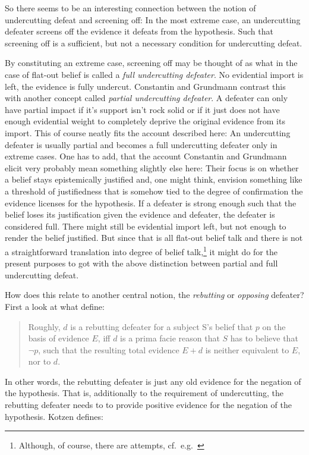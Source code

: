 \documentclass[11pt, a4paper]{scrartcl}
\renewcommand{\i}[1]{\emph{#1}}
\begin{document}
So there seems to be an interesting connection between the notion of undercutting defeat and screening off: In the most extreme case, an undercutting defeater screens off the evidence it defeats from the hypothesis. Such that screening off is a sufficient, but not a necessary condition for undercutting defeat.

By constituting an extreme case, screening off may be thought of as what in the case of flat-out belief is called a \i{full undercutting defeater}. No evidential import is left, the evidence is fully undercut. Constantin and Grundmann contrast this with another concept called \i{partial undercutting defeater}. A defeater can only have partial impact if it's support isn't rock solid or if it just does not have enough evidential weight to completely deprive the original evidence from its import. This of course neatly fits the account described here: An undercutting defeater is usually partial and becomes a full undercutting defeater only in extreme cases. One has to add, that the account Constantin and Grundmann elicit very probably mean something slightly else here: Their focus is on whether a belief stays epistemically justified and, one might think, envision something like a threshold of justifiedness that is somehow tied to the degree of confirmation the evidence licenses for the hypothesis. If a defeater is strong enough such that the belief loses its justification given the evidence and defeater, the defeater is considered full. There might still be evidential import left, but not enough to render the belief justified. But since that is all flat-out belief talk and there is not a straightforward translation into degree of belief talk,\footnote{Although, of course, there are attempts, cf.\ e.g.\ \textcite{Pettigrew2017}} it might do for the present purposes to got with the above distinction between partial and full undercutting defeat. 

How does this relate to another central notion, the \i{rebutting} or \i{opposing} defeater? First a look at what \textcite[11]{Constantin2017} define:  

\begin{quote}
Roughly, $d$ is a  rebutting defeater for a subject S’s belief that $p$ on the basis of evidence $E$, iff $d$ is a prima facie reason that $S$ has to believe that $\neg p$, such that  the resulting total evidence  $E+d$ is neither equivalent to $E$, nor to $d$. 
\end{quote}

In other words, the rebutting defeater is just any old evidence for the negation of the hypothesis. That is, additionally to the requirement of undercutting, the rebutting defeater needs to to provide positive evidence for the negation of the hypothesis. Kotzen defines:
\end{document}
